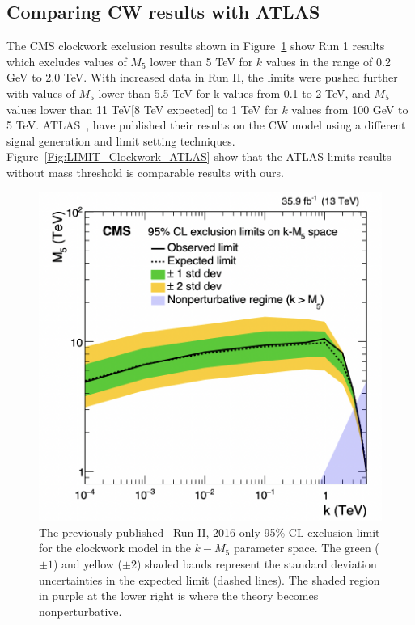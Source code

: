 
\subsection{\label{sec:ATLAS_results} Comparing CW results with ATLAS}

The CMS clockwork exclusion results shown in Figure~\ref{Fig:LIMIT_Clockwork_RUN1} show Run 1 results which excludes values of $M_5$ lower than 5 TeV for $k$ values in the range of 0.2 GeV to 2.0 TeV. With increased data in Run II, the limits were pushed further with values of $M_5$ lower than 5.5 TeV for k values from 0.1 to 2 TeV, and $M_5$ values lower than 11 TeV[8 TeV expected] to 1 TeV for $k$ values from 100 GeV to 5 TeV.  ATLAS~\cite{ATLAS:2023hbp}, have published their results on the CW model using a different signal generation and limit setting techniques. Figure~\ref{Fig:LIMIT_Clockwork_ATLAS} show that the ATLAS limits results without mass threshold is comparable results with ours.


\begin{figure}[htbp]
\centering
\includegraphics[width=0.47\linewidth]{fig/CWCMSI.png}
\caption{The previously published~\cite{cmsdiphoton2016} Run II, 2016-only 95\% CL exclusion limit for the clockwork model in the $k{-}M_5$ parameter space. The green ($\pm1$) and yellow ($\pm2$) shaded bands represent the standard deviation uncertainties in the expected limit (dashed lines). The shaded region in purple at the lower right is where the theory becomes nonperturbative.}
\label{Fig:LIMIT_Clockwork_RUN1}
\end{figure}



